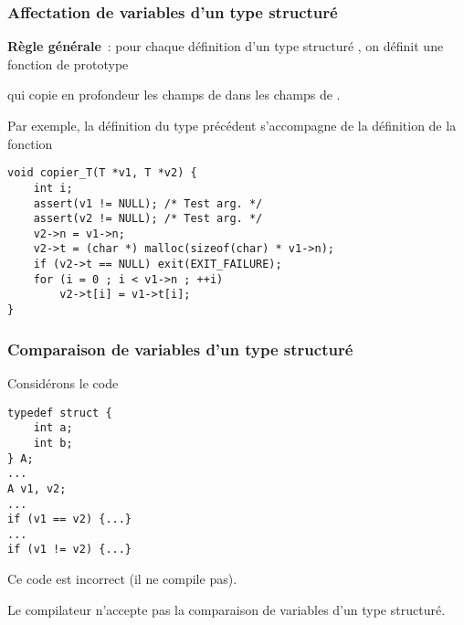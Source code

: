 \begin{frame}[fragile]
\frametitle{Affectation de variables d'un type structuré}
{\bf Règle générale}~: pour chaque définition d'un type structuré ,
on définit une fonction de prototype
\begin{center}
\end{center}
qui \alert{copie en profondeur} les champs de  dans les champs
de .
\medskip

Par exemple, la définition du type  précédent s'accompagne de la
définition de la fonction
\begin{lstlisting}
void copier_T(T *v1, T *v2) {
    int i;
    assert(v1 != NULL); /* Test arg. */
    assert(v2 != NULL); /* Test arg. */
    v2->n = v1->n;
    v2->t = (char *) malloc(sizeof(char) * v1->n);
    if (v2->t == NULL) exit(EXIT_FAILURE);
    for (i = 0 ; i < v1->n ; ++i)
        v2->t[i] = v1->t[i];
}
\end{lstlisting}
\end{frame}

\begin{frame}[fragile]
\frametitle{Comparaison de variables d'un type structuré}
Considérons le code
\begin{multicols}{2}
\begin{lstlisting}
typedef struct {
    int a;
    int b;
} A;
...
A v1, v2;
...
if (v1 == v2) {...}
...
if (v1 != v2) {...}
\end{lstlisting}
\end{multicols}
\medskip

Ce code est incorrect (il ne compile pas).
\medskip

Le compilateur n'accepte pas la comparaison de variables d'un type
structuré.
\smallskip

\smallskip

\end{frame}

